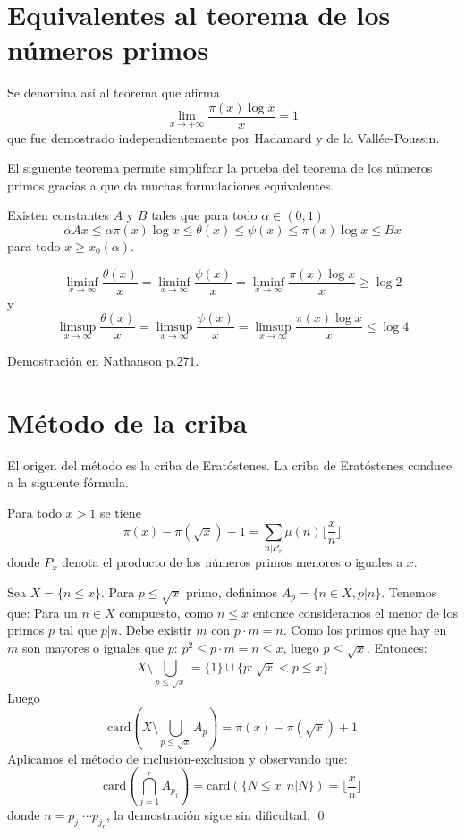 \documentclass[TAN.tex]{subfiles}
\begin{document}
\section{Equivalentes al teorema de los números primos}
Se denomina así al teorema que afirma
\[ \lim_{x\to+∞} \frac{π(x)\log x}{x} = 1 \]
que fue demostrado independientemente por Hadamard y de la Vallée-Poussin.

El siguiente teorema permite simplifcar la prueba del teorema de los números primos gracias a que da muchas formulaciones equivalentes.

\begin{teorema}[Chebyshev]
Existen constantes $A$ y $B$ tales que para todo $α \in (0,1)$
\[ αAx ≤ απ(x)\log x ≤ θ(x) ≤ ψ(x) ≤ π(x)\log x ≤ Bx \]
para todo $x ≥ x_0(α)$.
\end{teorema}

\begin{teorema}[Chebyshev]
\[ \liminf_{x\to∞} \frac{θ(x)}{x} = \liminf_{x\to∞} \frac{ψ(x)}{x} = \liminf_{x\to∞} \frac{π(x)\log x}{x} ≥ \log 2 \]
y
\[ \limsup_{x\to∞} \frac{θ(x)}{x} = \limsup_{x\to∞} \frac{ψ(x)}{x} = \limsup_{x\to∞} \frac{π(x)\log x}{x} ≤ \log 4 \]
\end{teorema}
Demostración en Nathanson p.271.

\section{Método de la criba}
El origen del método es la criba de Eratóstenes. La criba de Eratóstenes conduce a la siguiente fórmula.

\begin{teorema}
Para todo $x > 1$ se tiene
\[ π(x) - π(\sqrt{x}) + 1 = \sum_{n|P_x}μ(n)\lfloor\frac{x}{n}\rfloor \]
donde $P_x$ denota el producto de los números primos menores o iguales a $x$.
\end{teorema}

\begin{dem}
Sea $X=\{n≤x\}$. Para $p≤\sqrt{x}$ primo, definimos $A_p=\{n \in X, p|n\}$.
Tenemos que:
Para un $n \in X$ compuesto, como $n≤x$ entonce consideramos el menor de los primos $p$ tal que $p|n$. Debe existir $m$ con $p\cdot m = n$. Como los primos que hay en $m$ son mayores o iguales que $p$: $p^2 ≤ p\cdot m = n ≤ x$, luego $p≤\sqrt{x}$. Entonces:
\[ X \setminus \bigcup_{p≤\sqrt{x}} = \{1 \} \cup \{p : \sqrt{x} < p ≤ x\} \]
Luego
\[ \text{card}\left(X \setminus \bigcup_{p≤\sqrt{x}} A_p\right) = π(x) - π(\sqrt{x}) + 1 \]
Aplicamos el método de inclusión-exclusion y observando que:
\[ \text{card}\left(\bigcap_{j=1}^r A_{p_j}\right) =\text{card}(\{N≤x : n|N\}) = \lfloor \frac{x}{n} \rfloor\]
donde $n = p_{j_1}\cdots p_{j_r}$, la demostración sigue sin dificultad.
\qed
\end{dem}
\end{document}
